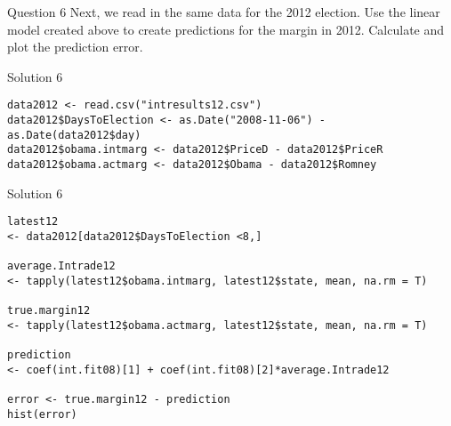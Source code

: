 \documentclass[presentation]{beamer}
\begin{document}
\begin{frame}[label={sec:orgebcacc4}]{Question 6}
Next, we read in the same data for the 2012 election. Use the linear model created above to create predictions for the margin in 2012. Calculate and plot the prediction error.
\end{frame}

\begin{frame}[fragile,shrink=25,label={sec:org260015c}]{Solution 6}
 \begin{verbatim}
data2012 <- read.csv("intresults12.csv")
data2012$DaysToElection <- as.Date("2008-11-06") - as.Date(data2012$day)
data2012$obama.intmarg <- data2012$PriceD - data2012$PriceR
data2012$obama.actmarg <- data2012$Obama - data2012$Romney
\end{verbatim}
\end{frame}


\begin{frame}[fragile,shrink=25,label={sec:org2e41f7d}]{Solution 6}
 \begin{verbatim}
latest12
<- data2012[data2012$DaysToElection <8,]

average.Intrade12
<- tapply(latest12$obama.intmarg, latest12$state, mean, na.rm = T)

true.margin12
<- tapply(latest12$obama.actmarg, latest12$state, mean, na.rm = T)

prediction
<- coef(int.fit08)[1] + coef(int.fit08)[2]*average.Intrade12

error <- true.margin12 - prediction
hist(error)
\end{verbatim}
\end{frame}
\end{document}
